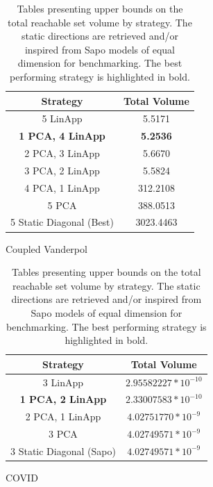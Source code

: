 \begin{table}[h!]
    \hspace{1em}
    \begin{subtable}[h]{0.45\textwidth}
         \centering
         \begin{tabular}{|c|c|}
         \hline
         Strategy & Total  Volume \\
         \hline
         5 LinApp & 5.5171 \\
         \hline
         {\bf 1 PCA, 4 LinApp } & {\bf 5.2536} \\
         \hline
         2 PCA, 3 LinApp  & 5.6670\\
         \hline
         3 PCA, 2 LinApp  & 5.5824\\
         \hline
         4 PCA, 1 LinApp  & 312.2108 \\
         \hline
         5 PCA  & 388.0513 \\
         \hline
         5 Static Diagonal (Best) & 3023.4463  \\
         \hline
        \end{tabular}
        \caption{Coupled Vanderpol}
        \label{tab:sirvol}
     \end{subtable}\hspace{1 em}
    \begin{subtable}[h]{0.45\textwidth}
         \centering
         \begin{tabular}{|c|c|}
         \hline
         Strategy & Total  Volume \\
         \hline
         3 LinApp & $2.95582227 * 10^{-10}$ \\
         \hline
         {\bf 1 PCA, 2 LinApp } & {\bf $2.33007583 * 10^{-10}$}\\
         \hline
         2 PCA, 1 LinApp &$ 4.02751770 * 10^{-9}$\\
         \hline
         3 PCA & $4.02749571 * 10^{-9}$\\
         \hline
         3 Static Diagonal (Sapo) & $4.02749571 * 10^{-9}$\\
         \hline
        \end{tabular}
        \caption{COVID}
        \label{tab:covidvol}
     \end{subtable}
 \caption{Tables presenting upper bounds on the total reachable set volume by strategy. The static directions are retrieved and/or inspired from Sapo models of equal dimension for benchmarking. The best performing strategy is highlighted in bold.}
     \label{tab:voltable}
\end{table}
\clearpage

